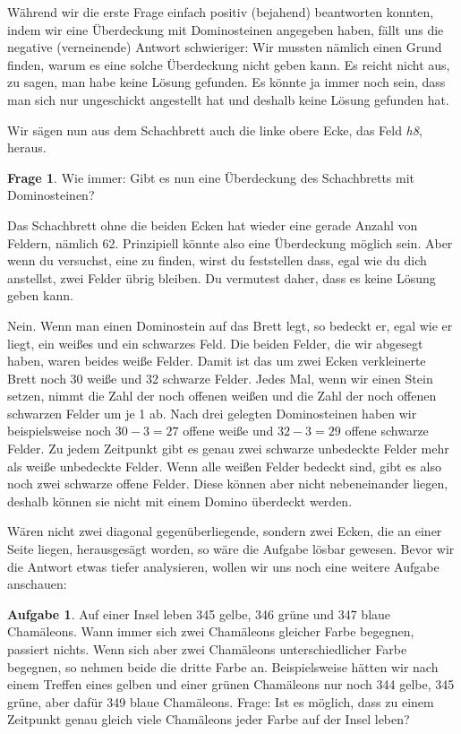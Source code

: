 \documentclass[a4paper,ngerman,12pt]{scrartcl}
\theoremstyle{definition}
\newtheorem*{aufg}{Aufgabe}
\newtheorem*{frage}{Frage}
\begin{document}
Während wir die erste Frage einfach positiv (bejahend) beantworten konnten, indem wir eine Überdeckung mit Dominosteinen angegeben haben, fällt uns die negative (verneinende) Antwort schwieriger: Wir mussten nämlich einen Grund finden, warum es eine solche Überdeckung nicht geben kann. Es reicht nicht aus, zu sagen, man habe keine Lösung gefunden. Es könnte ja immer noch sein, dass man sich nur ungeschickt angestellt hat und deshalb keine Lösung gefunden hat.

Wir sägen nun aus dem Schachbrett auch die linke obere Ecke, das Feld \emph{h8}, heraus.

\begin{frage}
  Wie immer: Gibt es nun eine Überdeckung des Schachbretts mit Dominosteinen?
\end{frage}

Das Schachbrett ohne die beiden Ecken hat wieder eine gerade Anzahl von Feldern, nämlich 62. Prinzipiell könnte also eine Überdeckung möglich sein. Aber wenn du versuchst, eine zu finden, wirst du feststellen dass, egal wie du dich anstellst, zwei Felder übrig bleiben. Du vermutest daher, dass es keine Lösung geben kann.

\begin{antw}
  Nein. Wenn man einen Dominostein auf das Brett legt, so bedeckt er, egal wie er liegt, ein weißes und ein schwarzes Feld. Die beiden Felder, die wir abgesegt haben, waren beides weiße Felder. Damit ist das um zwei Ecken verkleinerte Brett noch 30 weiße und 32 schwarze Felder. Jedes Mal, wenn wir einen Stein setzen, nimmt die Zahl der noch offenen weißen und die Zahl der noch offenen schwarzen Felder um je 1 ab. Nach drei gelegten Dominosteinen haben wir beispielsweise noch $30-3=27$ offene weiße und $32-3=29$ offene schwarze Felder. Zu jedem Zeitpunkt gibt es genau zwei schwarze unbedeckte Felder mehr als weiße unbedeckte Felder. Wenn alle weißen Felder bedeckt sind, gibt es also noch zwei schwarze offene Felder. Diese können aber nicht nebeneinander liegen, deshalb können sie nicht mit einem Domino überdeckt werden.
\end{antw}

Wären nicht zwei diagonal gegenüberliegende, sondern zwei Ecken, die an einer Seite liegen, herausgesägt worden, so wäre die Aufgabe lösbar gewesen. Bevor wir die Antwort etwas tiefer analysieren, wollen wir uns noch eine weitere Aufgabe anschauen:

\begin{aufg}
  Auf einer Insel leben 345 gelbe, 346 grüne und 347 blaue Chamäleons. Wann immer sich zwei Chamäleons gleicher Farbe begegnen, passiert nichts. Wenn sich aber zwei Chamäleons unterschiedlicher Farbe begegnen, so nehmen beide die dritte Farbe an. Beispielsweise hätten wir nach einem Treffen eines gelben und einer grünen Chamäleons nur noch 344 gelbe, 345 grüne, aber dafür 349 blaue Chamäleons. Frage: Ist es möglich, dass zu einem Zeitpunkt genau gleich viele Chamäleons jeder Farbe auf der Insel leben?
\end{aufg}
\end{document}
